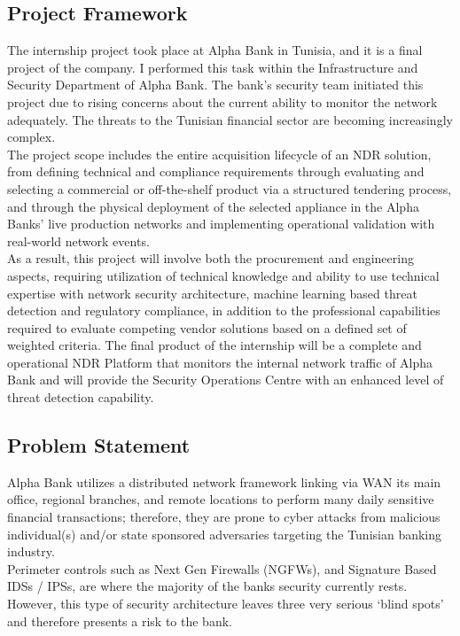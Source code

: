 \documentclass[12pt,a4paper]{report}
\begin{document}
\subsection{Project Framework}

The internship project took place at Alpha Bank in Tunisia, and it is a final project of the company. I performed this task within the Infrastructure and Security Department of Alpha Bank. The bank's security team initiated this project due to rising concerns about the current ability to monitor the network adequately. The threats to the Tunisian financial sector are becoming increasingly complex.\\

The project scope includes the entire acquisition lifecycle of an NDR solution, from defining technical and compliance requirements through evaluating and selecting a commercial or off-the-shelf product via a structured tendering process, and through the physical deployment of the selected appliance in the Alpha Banks' live production networks and implementing operational validation with real-world network events.\\

As a result, this project will involve both the procurement and engineering aspects, requiring utilization of technical knowledge and ability to use technical expertise with network security architecture, machine learning based threat detection and regulatory compliance, in addition to the professional capabilities required to evaluate competing vendor solutions based on a defined set of weighted criteria. The final product of the internship will be a complete and operational NDR Platform that monitors the internal network traffic of Alpha Bank and will provide the Security Operations Centre with an enhanced level of threat detection capability.



\subsection{Problem Statement}

Alpha Bank utilizes a distributed network framework linking via WAN its main office, regional branches, and remote locations to perform many daily sensitive financial transactions; therefore, they are prone to cyber attacks from malicious individual(s) and/or state sponsored adversaries targeting the Tunisian banking industry.\\

Perimeter controls such as Next Gen Firewalls (NGFWs), and Signature Based IDSs / IPSs, are where the majority of the banks security currently rests. However, this type of security architecture leaves three very serious ‘blind spots’ and therefore presents a risk to the bank.\\
\end{document}
